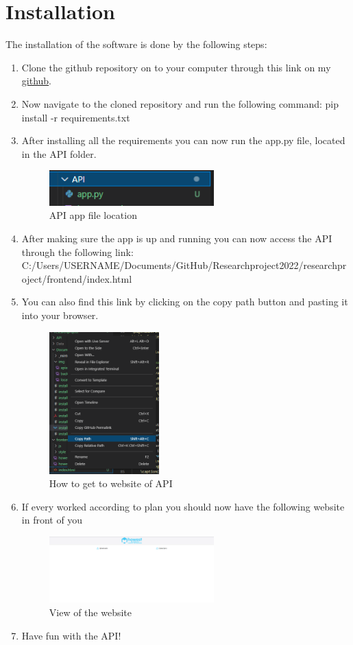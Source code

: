 \documentclass{article}
\begin{document}
\section{Installation}
The installation of the software is done by the following steps:
\begin{enumerate}
\item Clone the github repository on to your computer through this link on my \href{https://github.com/PieterSpecenier/Researchproject2022}{github}.
\item Now navigate to the cloned repository and run the following command: pip install -r requirements.txt
\item After installing all the requirements you can now run the app.py file, located in the API folder. 
\begin{figure}[H]
    \centering
    \includegraphics[width=0.6\textwidth]{apiapp.png}
    \caption{API app file location}
\end{figure}
\item After making sure the app is up and running you can now access the API through the following link: C:/Users/{USERNAME}/Documents/GitHub/Researchproject2022/researchproject/frontend/index.html
\item You can also find this link by clicking on the copy path button and pasting it into your browser.
\begin{figure}[H]
    \centering
    \includegraphics[width=0.4\textwidth]{locationwebsite.PNG}
    \caption{How to get to website of API}
\end{figure}
\item If every worked according to plan you should now have the following website in front of you
\begin{figure}[H]
    \centering
    \includegraphics[width=0.6\textwidth]{website.PNG}
    \caption{View of the website}
\end{figure}
\item Have fun with the API!
\end{enumerate}
\end{document}
